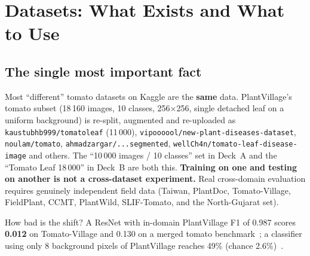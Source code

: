 \section{Datasets: What Exists and What to Use}
\label{sec:datasets}

\subsection{The single most important fact}
Most ``different'' tomato datasets on Kaggle are the \textbf{same} data. PlantVillage's tomato subset (18\,160 images, 10 classes, 256$\times$256, single detached leaf on a uniform background) is re-split, augmented and re-uploaded as \texttt{kaustubhb999/tomatoleaf} (11\,000), \texttt{vipoooool/new-plant-diseases-dataset}, \texttt{noulam/tomato}, \texttt{ahmadzargar/...segmented}, \texttt{wellCh4n/tomato-leaf-disease-image} and others. The ``10\,000 images / 10 classes'' set in Deck~A and the ``Tomato Leaf 18\,000'' in Deck~B are both this. \textbf{Training on one and testing on another is not a cross-dataset experiment.} Real cross-domain evaluation requires genuinely independent field data (Taiwan, PlantDoc, Tomato-Village, FieldPlant, CCMT, PlantWild, SLIF-Tomato, and the North-Gujarat set).

How bad is the shift? A ResNet with in-domain PlantVillage F1 of 0.987 scores \textbf{0.012} on Tomato-Village and 0.130 on a merged tomato benchmark~\cite{biorxiv2024}; a classifier using only 8 background pixels of PlantVillage reaches 49\% (chance 2.6\%)~\cite{noyan2022}.

